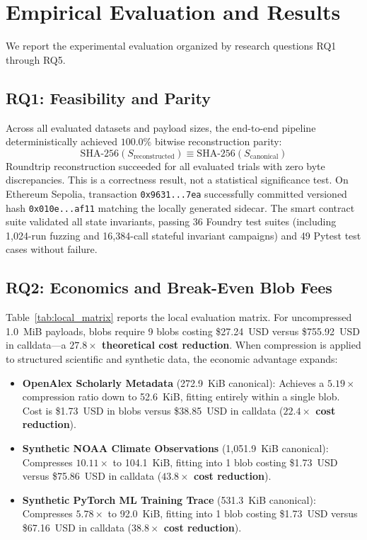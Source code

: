 \section{Empirical Evaluation and Results}
\label{sec:results}

We report the experimental evaluation organized by research questions RQ1 through RQ5.

\subsection{RQ1: Feasibility and Parity}
Across all evaluated datasets and payload sizes, the end-to-end pipeline deterministically achieved $100.0\%$ bitwise reconstruction parity:
\begin{equation}
\text{SHA-256}(S_{\text{reconstructed}}) \equiv \text{SHA-256}(S_{\text{canonical}})
\end{equation}
Roundtrip reconstruction succeeded for all evaluated trials with zero byte discrepancies. This is a correctness result, not a statistical significance test. On Ethereum Sepolia, transaction \texttt{0x9631...7ea} successfully committed versioned hash \texttt{0x010e...af11} matching the locally generated sidecar. The smart contract suite validated all state invariants, passing 36 Foundry test suites (including 1,024-run fuzzing and 16,384-call stateful invariant campaigns) and 49 Pytest test cases without failure.

\subsection{RQ2: Economics and Break-Even Blob Fees}


Table~\ref{tab:local_matrix} reports the local evaluation matrix. For uncompressed 1.0~MiB payloads, blobs require 9 blobs costing \$27.24~USD versus \$755.92~USD in calldata---a \textbf{$27.8\times$ theoretical cost reduction}. When compression is applied to structured scientific and synthetic data, the economic advantage expands:
\begin{itemize}
    \item \textbf{OpenAlex Scholarly Metadata} (272.9~KiB canonical): Achieves a $5.19\times$ compression ratio down to 52.6~KiB, fitting entirely within a single blob. Cost is \$1.73~USD in blobs versus \$38.85~USD in calldata (\textbf{$22.4\times$ cost reduction}).
    \item \textbf{Synthetic NOAA Climate Observations} (1,051.9~KiB canonical): Compresses $10.11\times$ to 104.1~KiB, fitting into 1 blob costing \$1.73~USD versus \$75.86~USD in calldata (\textbf{$43.8\times$ cost reduction}).
    \item \textbf{Synthetic PyTorch ML Training Trace} (531.3~KiB canonical): Compresses $5.78\times$ to 92.0~KiB, fitting into 1 blob costing \$1.73~USD versus \$67.16~USD in calldata (\textbf{$38.8\times$ cost reduction}).
\end{itemize}

